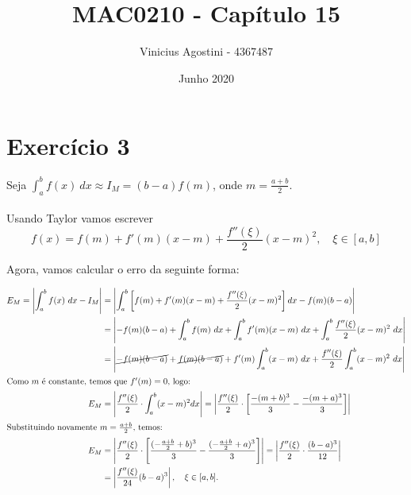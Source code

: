 \documentclass[leqno]{article}
\title{MAC0210 - Capítulo 15}
\author{Vinicius Agostini - 4367487}
\date{Junho 2020}
\begin{document}
\maketitle

\section*{Exercício 3}
Seja $\int_a^b f(x)\ dx \approx I_M = (b-a)f(m)$, onde $m = \frac{a+b}{2}$. \\ \\
Usando Taylor vamos escrever
$$f(x) = f(m) + f'(m)(x-m) + \frac{f''(\xi)}{2}(x-m)^2, \quad \xi \in [a, b]$$

Agora, vamos calcular o erro da seguinte forma:

\begin{align*}
    E_M = \left| \int_a^b f(x)\ dx - I_M \right| &= \left| \int_a^b \left[ f(m) + f'(m)(x-m) + \frac{f''(\xi)}{2}(x-m)^2 \right]dx -f(m)(b-a) \right| \\
                                  &= \left| -f(m)(b-a) + \int_a^b f(m)\ dx + \int_a^b f'(m)(x-m)\ dx + \int_a^b \frac{f''(\xi)}{2}(x-m)^2\ dx \right| \\
                                  &= \left| \cancel{-f(m)(b-a)} + \cancel{f(m)(b-a)} + f'(m)\int_a^b (x-m)\ dx + \frac{f''(\xi)}{2}\int_a^b (x-m)^2\ dx \right| \\
    \intertext{Como $m$ é constante, temos que $f'(m) = 0$, logo:}
    E_M                           &= \left| \frac{f''(\xi)}{2} \cdot \int_a^b (x-m)^2dx \right| = \left| \frac{f''(\xi)}{2} \cdot \left[ \frac{-(m+b)^3}{3} - \frac{-(m+a)^3}{3} \right] \right| \\
    \intertext{Substituindo novamente $m = \frac{a+b}{2}$, temos:}
    E_M                           &= \left| \frac{f''(\xi)}{2} \cdot \left[ \frac{(-\frac{a+b}{2}+b)^3}{3} - \frac{(-\frac{a+b}{2}+a)^3}{3} \right] \right| = \left| \frac{f''(\xi)}{2} \cdot \frac{(b-a)^3}{12} \right| \\
                                  &= \left| \frac{f''(\xi)}{24}(b-a)^3 \right|, \quad \xi \in [a, b].
\end{align*}
\end{document}

